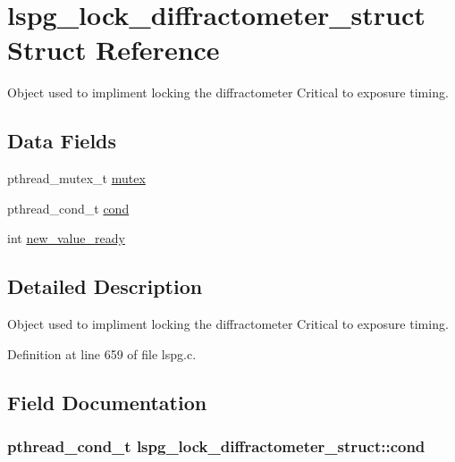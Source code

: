 \hypertarget{structlspg__lock__diffractometer__struct}{
\section{lspg\_\-lock\_\-diffractometer\_\-struct Struct Reference}
\label{structlspg__lock__diffractometer__struct}
}


Object used to impliment locking the diffractometer Critical to exposure timing.  
\subsection*{Data Fields}
\begin{DoxyCompactItemize}
\item 
pthread\_\-mutex\_\-t \hyperlink{structlspg__lock__diffractometer__struct_a362e848dfd1551428b8d12d8776fd2ed}{mutex}
\item 
pthread\_\-cond\_\-t \hyperlink{structlspg__lock__diffractometer__struct_a7614c802af37c1d3358479a2c13ac898}{cond}
\item 
int \hyperlink{structlspg__lock__diffractometer__struct_ae94acdf44008ce48930e3083f08f5b6c}{new\_\-value\_\-ready}
\end{DoxyCompactItemize}


\subsection{Detailed Description}
Object used to impliment locking the diffractometer Critical to exposure timing. 

Definition at line 659 of file lspg.c.

\subsection{Field Documentation}
\hypertarget{structlspg__lock__diffractometer__struct_a7614c802af37c1d3358479a2c13ac898}{
\subsubsection[{cond}]{\setlength{\rightskip}{0pt plus 5cm}pthread\_\-cond\_\-t {\bf lspg\_\-lock\_\-diffractometer\_\-struct::cond}}}
\label{structlspg__lock__diffractometer__struct_a7614c802af37c1d3358479a2c13ac898}


